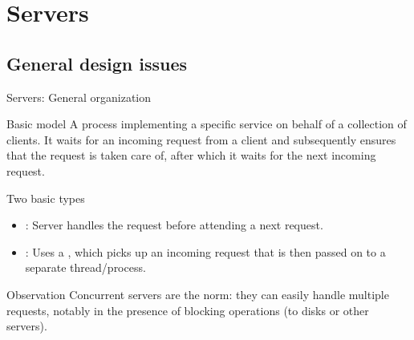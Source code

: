 \section{Servers}
\subsection{General design issues}
\begin{slide}{Servers: General organization}
  \begin{block}{Basic model} 
    A process implementing a specific service on behalf of a collection of clients. It waits for an incoming
    request from a client and subsequently ensures that the request is taken care of, after which it waits for
    the next incoming request.
  \end{block}
  \begin{block}{Two basic types}
    \begin{itemize}
    \item {}: Server handles the request before attending a next request.
    \item {}: Uses a , which picks up an incoming request that is then
      passed on to a separate thread/process.
    \end{itemize}
  \end{block}
  \begin{alertblock}{Observation}
    Concurrent servers are the norm: they can easily handle multiple requests, notably in the presence of
    blocking operations (to disks or other servers).
  \end{alertblock}
\end{slide}
